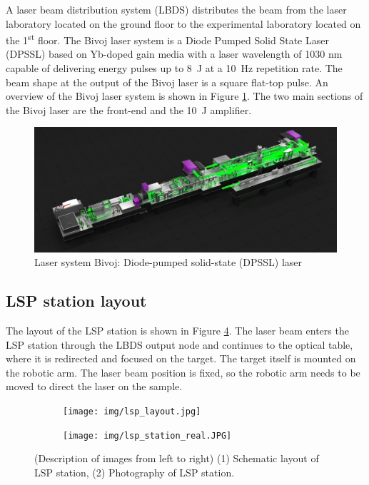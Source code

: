  A laser beam distribution system (LBDS) distributes the beam from the laser laboratory located on the ground floor to the experimental laboratory located on the 1\textsuperscript{st} floor. The Bivoj laser system is a Diode Pumped Solid State Laser (DPSSL) based on Yb-doped gain media with a laser wavelength of 1030 nm capable of delivering energy pulses up to \SI{8}{\joule} at a \SI{10}{\hertz} repetition rate. The beam shape at the output of the Bivoj laser is a square flat-top pulse. An overview of the Bivoj laser system is shown in Figure \ref{fig:bivoj}. The two main sections of the Bivoj laser are the front-end and the \SI{10}{\joule} amplifier.
 
 \begin{figure}[h]
    \centering
    \includegraphics[width=1.0\linewidth]{img/bivoj.jpg}
    \caption{Laser system Bivoj: Diode-pumped solid-state (DPSSL) laser}
    \label{fig:bivoj}
\end{figure}
 
 \subsection{LSP station layout}

The layout of the LSP station is shown in Figure \ref{fig:lsplayout}. The laser beam enters the LSP station through the LBDS output node and
continues to the optical table, where it is redirected and
focused on the target. The target itself is mounted on the
robotic arm. The laser beam position is fixed, so the robotic
arm needs to be moved to direct the laser on the sample.

\begin{figure}[h]
\centering
\begin{subfigure}{.45\textwidth}

    \texttt{[image: img/lsp\_layout.jpg]}

    \label{fig:a}
\end{subfigure}
\begin{subfigure}{.45\textwidth}

    \texttt{[image: img/lsp\_station\_real.JPG]}

    \label{fig:b}
\end{subfigure}

\caption{(Description of images from left to right) (1) Schematic layout of LSP station, (2) Photography of LSP station.}
\label{fig:lsplayout}
\end{figure}



